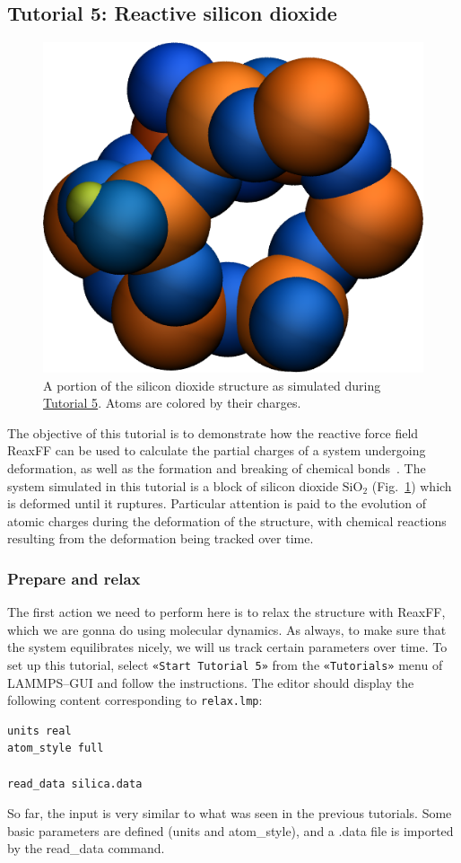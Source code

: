 \documentclass[9pt,tutorial]{livecoms}
\newcommand{\lmpcmd}[1]{\hspace{0pt}\colorbox{listing}{\textcolor{command}{\small{#1}}}\hspace{0pt}} %
\newcommand{\flecmd}[1]{\textcolor{command}{\texttt{#1}}} %
\newcommand{\guicmd}[1]{\textcolor{command}{\texttt{«#1»}}} %
\begin{document}
\subsection{Tutorial 5: Reactive silicon dioxide}
\label{reactive-silicon-dioxide-label}

\begin{figure}
\centering
\includegraphics[width=0.55\linewidth]{SIO}
\caption{A portion of the silicon dioxide structure as simulated during
\hyperref[reactive-silicon-dioxide-label]{Tutorial 5}.  Atoms are colored by their charges.}
\label{fig:SIO}
\end{figure}

The objective of this tutorial is to demonstrate how the reactive force field ReaxFF
can be used to calculate the partial charges of a system undergoing deformation, as well as
the formation and breaking of chemical bonds~\cite{van2001reaxff, zou2012investigation}.
The system simulated in this tutorial is a block of silicon dioxide $\text{SiO}_2$ (Fig.~\ref{fig:SIO})
which is deformed until it ruptures.  Particular attention is paid to the evolution
of atomic charges during the deformation of the structure, with chemical reactions
resulting from the deformation being tracked over time.

\subsubsection{Prepare and relax}

The first action we need to perform here is to relax the structure with ReaxFF,
which we are gonna do using molecular dynamics.  As always, to make sure that the system
equilibrates nicely, we will us track certain parameters over time.  To set up this
tutorial, select \guicmd{Start Tutorial 5} from the
\guicmd{Tutorials} menu of LAMMPS--GUI and follow the instructions.
The editor should display the following content corresponding to \flecmd{relax.lmp}:
\begin{lstlisting}
units real
atom_style full

read_data silica.data

\end{lstlisting}
So far, the input is very similar to what was seen in the previous tutorials.
Some basic parameters are defined (\lmpcmd{units} and \lmpcmd{atom\_style}),
and a \lmpcmd{.data} file is imported by the \lmpcmd{read\_data} command.
\end{document}
